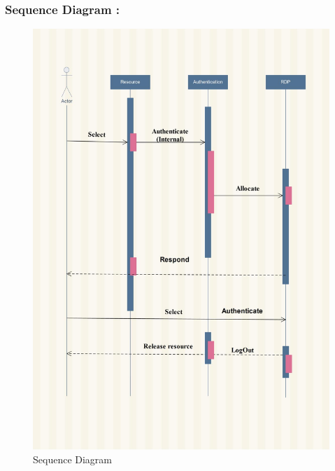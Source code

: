 \documentclass[12pt,a4paper,final,oneside]{report}
\begin{document}
	\subsubsection{Sequence Diagram :}
	\begin{figure}
		\centering	\includegraphics[width=1.0\linewidth,angle=0]
		{seq2.jpg}
		\caption{Sequence Diagram}
	\end{figure}
\end{document}

